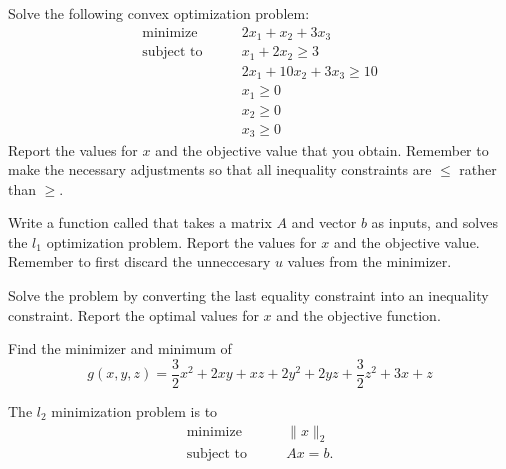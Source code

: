 
Solve the following convex optimization problem:
\begin{align*}
\text{minimize}\qquad &2x_1+x_2+3x_3 \\
\text{subject to}\qquad &x_1+2x_2 \geq 3 \\
	        &2x_1+10x_2+3x_3 \geq 10 \\
		&x_1 \geq 0 \\
		&x_2 \geq 0 \\
		&x_3 \geq 0
\end{align*}
Report the values for $x$ and the objective value that you obtain.
Remember to make the necessary adjustments so that all inequality constraints are $\leq$ rather than $\geq$.

Write a function called  that takes a matrix $A$ and vector $b$ as inputs, and solves the $l_1$ optimization problem. 
Report the values for $x$ and the objective value. 
Remember to first discard the unneccesary $u$ values from the minimizer.

Solve the problem by converting the last equality constraint into an inequality constraint.
Report the optimal values for $x$ and the objective function.

Find the minimizer and minimum of
\begin{equation*}
g(x,y,z) = \frac{3}{2}x^2 +2xy + xz+ 2y^2 +2yz+\frac{3}{2}z^2+3x + z
\end{equation*}
\begin{comment}
\begin{equation}
f(x) = \frac{1}{2}x\trp Qx - x\trp p
\end{equation}
where

\begin{center}
$Q =
\begin{bmatrix}
3 & 2 & 1\\
2 & 4 & 2\\
1 & 2 & 3\\
\end{bmatrix}
$
and $p =
\begin{bmatrix}
3\\
0\\
1\\
\end{bmatrix}
$
\end{center}
\end{comment}


The $l_2$ minimization problem is to
\begin{align*}
\text{minimize}\qquad &\|x\|_2\\
\text{subject to} \qquad &Ax = b.
\end{align*}


